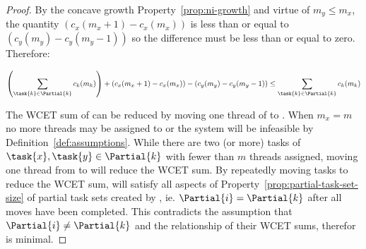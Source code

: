 \begin{theorem}
\begin{proof}
    By the concave growth Property~\ref{prop:ni-growth} and virtue of
    ${m_y \le m_x}$, the quantity ${(c_x(m_x + 1) - c_x(m_x))}$ is
    less than or equal to ${(c_y(m_y) - c_y(m_y - 1))}$ so the
    difference must be less than or equal to zero. Therefore:

    \begin{equation*}
      \left(\sum_{\task{k} \in \Partial{k}} c_k(m_k) \right)
      + (c_x(m_x + 1) - c_x(m_x)) - (c_y(m_y) - c_y(m_y - 1)) \le 
      \sum_{\task{k} \in \Partial{k}} c_k(m_k)
    \end{equation*}

    The WCET sum of  can be reduced by moving one thread of
     to . When ${m_x = m}$ no more threads may be
    assigned to  or the system will be infeasible by
    Definition~\ref{def:assumptions}. While there are two (or more)
    tasks of ${\task{x}, \task{y} \in \Partial{k}}$ with fewer than
    ${m}$ threads assigned, moving one thread from  to
     will reduce the WCET sum. By repeatedly moving tasks to
    reduce the WCET sum,  will satisfy all aspects of
    Property~\ref{prop:partial-task-set-size} of partial task sets
    created by \texdivide{}, ie. ${\Partial{i} = \Partial{k}}$ after
    all moves have been completed. This contradicts the assumption
    that ${\Partial{i} \not = \Partial{k}}$ and the relationship of
    their WCET sums, therefor  is minimal.
  \end{proof}
\end{theorem}
